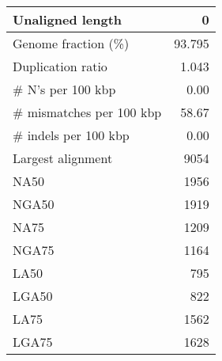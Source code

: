 \documentclass[12pt,a4paper]{article}
\begin{document}
\begin{table}[ht]
\begin{center}
\begin{tabular}{|l*{1}{|r}|}
Unaligned length & 0 \\ \hline
Genome fraction (\%) & 93.795 \\ \hline
Duplication ratio & 1.043 \\ \hline
\# N's per 100 kbp & 0.00 \\ \hline
\# mismatches per 100 kbp & 58.67 \\ \hline
\# indels per 100 kbp & 0.00 \\ \hline
Largest alignment & 9054 \\ \hline
NA50 & 1956 \\ \hline
NGA50 & 1919 \\ \hline
NA75 & 1209 \\ \hline
NGA75 & 1164 \\ \hline
LA50 & 795 \\ \hline
LGA50 & 822 \\ \hline
LA75 & 1562 \\ \hline
LGA75 & 1628 \\ \hline
\end{tabular}
\end{center}
\end{table}
\end{document}
